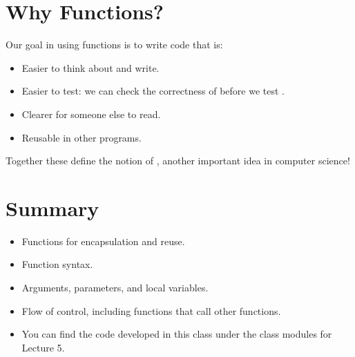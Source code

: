 \documentclass[letterpaper,10pt,english]{sphinxmanual}
\begin{document}
\section{Why Functions?}
\label{\detokenize{lecture_notes/lec05_functions2:id1}}
Our goal in using functions is to write code that is:
\begin{itemize}
\item {} 
Easier to think about and write.

\item {} 
Easier to test: we can check the correctness of 
before we test .

\item {} 
Clearer for someone else to read.

\item {} 
Reusable in other programs.

\end{itemize}

Together these define the notion of , another important
idea in computer science!


\section{Summary}
\label{\detokenize{lecture_notes/lec05_functions2:summary}}\begin{itemize}
\item {} 
Functions for encapsulation and reuse.

\item {} 
Function syntax.

\item {} 
Arguments, parameters, and local variables.

\item {} 
Flow of control, including functions that call other functions.

\item {} 
You can find the code developed in this class under the class
modules for Lecture 5.

\end{itemize}
\end{document}
